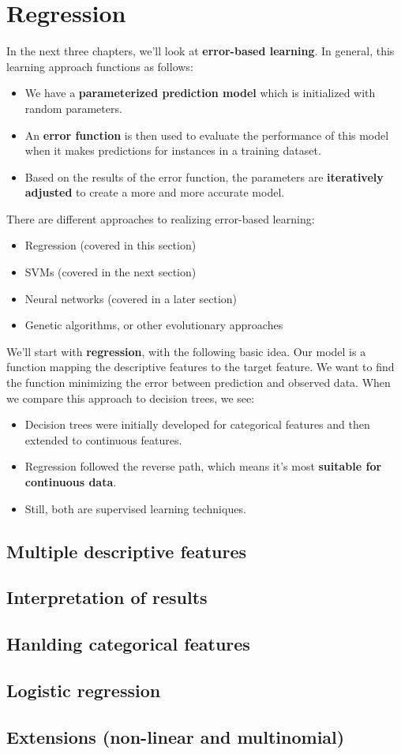\section{Regression}

In the next three chapters, we'll look at \textbf{error-based learning}. In general, this learning approach functions as follows:
\begin{itemize}
  \item We have a \textbf{parameterized prediction model} which is initialized with random parameters.
  \item An \textbf{error function} is then used to evaluate the performance of this model when it makes predictions for instances in a training dataset.
  \item Based on the results of the error function, the parameters are \textbf{iteratively adjusted} to create a more and more accurate model.
\end{itemize}

There are different approaches to realizing error-based learning:
\begin{itemize}
  \item Regression (covered in this section)
  \item SVMs (covered in the next section)
  \item Neural networks (covered in a later section)
  \item Genetic algorithms, or other evolutionary approaches
\end{itemize}

We'll start with \textbf{regression}, with the following basic idea. Our model is a function mapping the descriptive features to the target feature.  We want to find the function minimizing the error between prediction and observed data. When we compare this approach to decision trees, we see:
\begin{itemize}
  \item Decision trees were initially developed for categorical features and then extended to continuous features.
  \item Regression followed the reverse path, which means it's most \textbf{suitable for continuous data}.
  \item Still, both are supervised learning techniques.
\end{itemize}


\subsection{Multiple descriptive features}
\subsection{Interpretation of results}
\subsection{Hanlding categorical features}
\subsection{Logistic regression}
\subsection{Extensions (non-linear and multinomial)}

